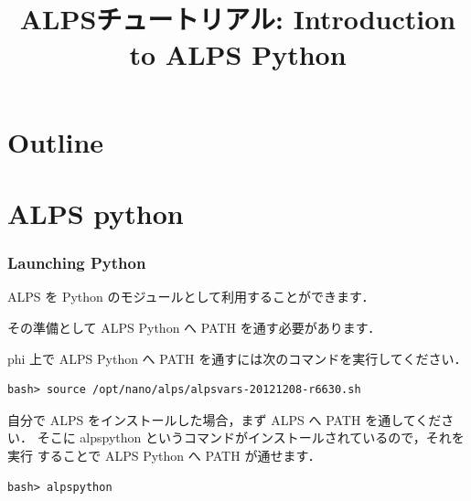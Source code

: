 
\title{ALPSチュートリアル: Introduction to ALPS Python}



\begin{frame}
 \titlepage
\end{frame}

\section*{Outline}
\begin{frame}
 \tableofcontents
\end{frame}

\section{ALPS python}
\begin{frame}[t,fragile]
 \frametitle{Launching Python}

 \alert{ALPS を Python のモジュールとして利用することができます．}

 その準備として ALPS Python へ PATH を通す必要があります．

 phi 上で ALPS Python へ PATH を通すには次のコマンドを実行してください．

\begin{lstlisting}
bash> source /opt/nano/alps/alpsvars-20121208-r6630.sh
\end{lstlisting}


 自分で ALPS をインストールした場合，まず ALPS へ PATH を通してください．
 そこに alpspython というコマンドがインストールされているので，それを実行
 することで ALPS Python へ PATH が通せます．

\begin{lstlisting}
bash> alpspython
\end{lstlisting}

\end{frame}

